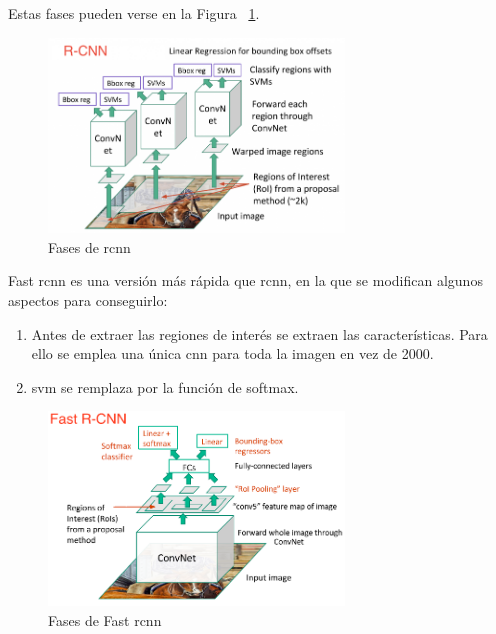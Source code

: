 Estas fases pueden verse en la Figura ~\ref{fig.rcnn}.

\begin{figure}[H]
  \begin{center}
    \includegraphics[width=0.7\textwidth]{figures/Estado_arte/rcnn.png}
		\caption{Fases de \acrshort{rcnn}}
		\label{fig.rcnn}
		\end{center}
\end{figure}

Fast \acrshort{rcnn} es una versión más rápida que \acrshort{rcnn}, en la que se modifican algunos aspectos para conseguirlo:
\begin{enumerate}
    \item Antes de extraer las regiones de interés se extraen las características. Para ello se emplea una única \acrshort{cnn} para toda la imagen en vez de 2000.
    \item \acrshort{svm} se remplaza por la función de softmax.
\end{enumerate}

\begin{figure}[H]
  \begin{center}
    \includegraphics[width=0.7\textwidth]{figures/Estado_arte/fast_rcnn.png}
		\caption{Fases de Fast \acrshort{rcnn}}
		\label{fig.fast_rcnn}
		\end{center}
\end{figure}


